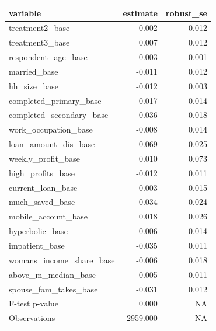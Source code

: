 
\begin{tabular}{lrr}
\toprule
variable & estimate & robust\_se\\
\midrule
treatment2\_base & 0.002 & 0.012\\
treatment3\_base & 0.007 & 0.012\\
respondent\_age\_base & -0.003 & 0.001\\
married\_base & -0.011 & 0.012\\
hh\_size\_base & -0.012 & 0.003\\
\addlinespace
completed\_primary\_base & 0.017 & 0.014\\
completed\_secondary\_base & 0.036 & 0.018\\
work\_occupation\_base & -0.008 & 0.014\\
loan\_amount\_dis\_base & -0.069 & 0.025\\
weekly\_profit\_base & 0.010 & 0.073\\
\addlinespace
high\_profits\_base & -0.012 & 0.011\\
current\_loan\_base & -0.003 & 0.015\\
much\_saved\_base & -0.034 & 0.024\\
mobile\_account\_base & 0.018 & 0.026\\
hyperbolic\_base & -0.006 & 0.014\\
\addlinespace
impatient\_base & -0.035 & 0.011\\
womans\_income\_share\_base & -0.006 & 0.018\\
above\_m\_median\_base & -0.005 & 0.011\\
spouse\_fam\_takes\_base & -0.031 & 0.012\\
F-test p-value & 0.000 & NA\\
\addlinespace
Observations & 2959.000 & NA\\
\bottomrule
\end{tabular}
